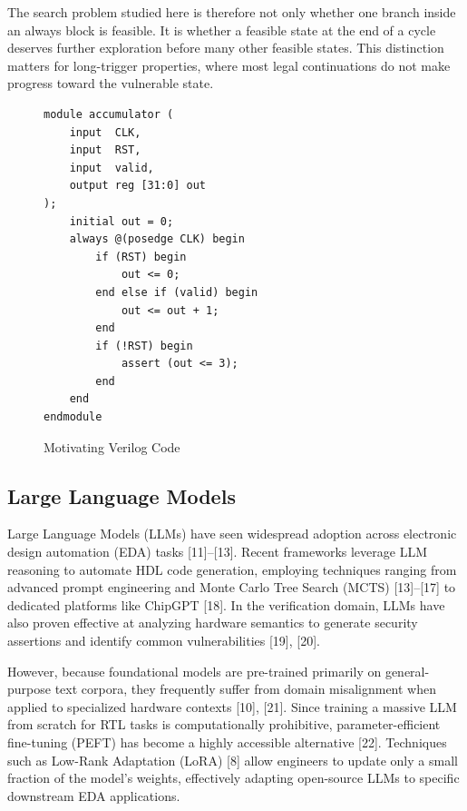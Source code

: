 \documentclass[conference]{IEEEtran}
\begin{document}
The search problem studied here is therefore not only whether one branch inside an always block is feasible. It is whether a feasible state at the end of a cycle deserves further exploration before many other feasible states. This distinction matters for long-trigger properties, where most legal continuations do not make progress toward the vulnerable state.


\begin{figure}[h!]
\begin{framed}
\begin{lstlisting}[caption={Accumulator used to illustrate temporal search difficulty.},label={lst:toy_acc}]
module accumulator (
    input  CLK,
    input  RST,
    input  valid,
    output reg [31:0] out
);
    initial out = 0;
    always @(posedge CLK) begin
        if (RST) begin
            out <= 0;
        end else if (valid) begin
            out <= out + 1;
        end
        if (!RST) begin
            assert (out <= 3);
        end
    end
endmodule
\end{lstlisting}
\end{framed}
\caption{Motivating Verilog Code}
\label{fig:verilog-fig}

\end{figure}

\subsection{Large Language Models}
Large Language Models (LLMs) have seen widespread adoption across electronic design automation (EDA) tasks [11]--[13]. Recent frameworks leverage LLM reasoning to automate HDL code generation, employing techniques ranging from advanced prompt engineering and Monte Carlo Tree Search (MCTS) [13]--[17] to dedicated platforms like ChipGPT [18]. In the verification domain, LLMs have also proven effective at analyzing hardware semantics to generate security assertions and identify common vulnerabilities [19], [20].

However, because foundational models are pre-trained primarily on general-purpose text corpora, they frequently suffer from domain misalignment when applied to specialized hardware contexts [10], [21]. Since training a massive LLM from scratch for RTL tasks is computationally prohibitive, parameter-efficient fine-tuning (PEFT) has become a highly accessible alternative [22]. Techniques such as Low-Rank Adaptation (LoRA) [8] allow engineers to update only a small fraction of the model's weights, effectively adapting open-source LLMs to specific downstream EDA applications.
\end{document}
